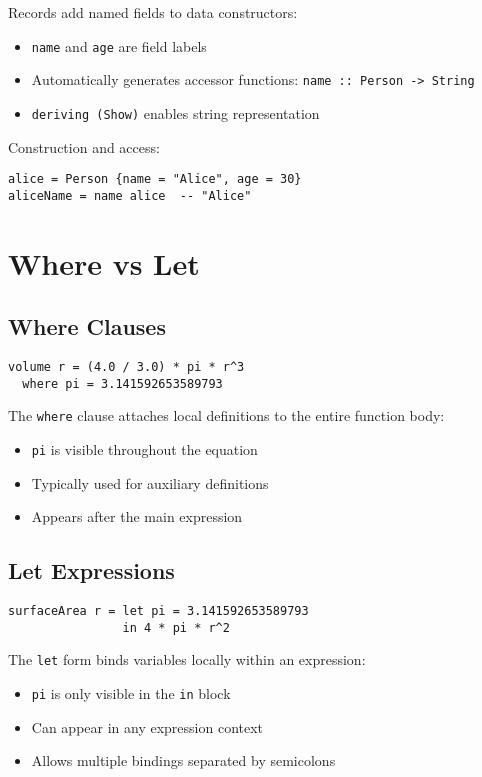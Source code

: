 \documentclass{book}
\begin{document}
Records add named fields to data constructors:
\begin{itemize}
\item \texttt{name} and \texttt{age} are field labels
\item Automatically generates accessor functions: \texttt{name :: Person -> String}
\item \texttt{deriving (Show)} enables string representation
\end{itemize}

Construction and access:
\begin{lstlisting}
alice = Person {name = "Alice", age = 30}
aliceName = name alice  -- "Alice"
\end{lstlisting}

\section{Where vs Let}
\label{sec:where-let}

\subsection{Where Clauses}
\begin{lstlisting}
volume r = (4.0 / 3.0) * pi * r^3
  where pi = 3.141592653589793
\end{lstlisting}

The \texttt{where} clause attaches local definitions to the entire function body:
\begin{itemize}
\item \texttt{pi} is visible throughout the equation
\item Typically used for auxiliary definitions
\item Appears after the main expression
\end{itemize}

\subsection{Let Expressions}
\begin{lstlisting}
surfaceArea r = let pi = 3.141592653589793
                in 4 * pi * r^2
\end{lstlisting}

The \texttt{let} form binds variables locally within an expression:
\begin{itemize}
\item \texttt{pi} is only visible in the \texttt{in} block
\item Can appear in any expression context
\item Allows multiple bindings separated by semicolons
\end{itemize}
\end{document}
